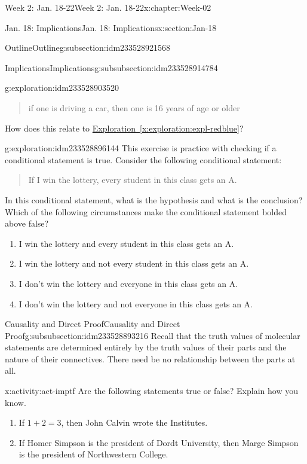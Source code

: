 \documentclass[oneside,10pt,]{book}
\newcommand{\xreffont}{\relax}
\numberwithin{equation}{section}
\begin{document}
\begin{chapterptx}{Week 2: Jan. 18-22}{}{Week 2: Jan. 18-22}{}{}{x:chapter:Week-02}
\begin{sectionptx}{Jan. 18: Implications}{}{Jan. 18: Implications}{}{}{x:section:Jan-18}
\begin{subsectionptx}{Outline}{}{Outline}{}{}{g:subsection:idm233528921568}
\begin{subsubsectionptx}{Implications}{}{Implications}{}{}{g:subsubsection:idm233528914784}
\begin{exploration}{}{g:exploration:idm233528903520}
\begin{quote}%
if one is driving a car, then one is 16 years of age or older\end{quote}
How does this relate to \hyperref[x:exploration:expl-redblue]{Exploration~{\xreffont\ref{x:exploration:expl-redblue}}}?%
\end{exploration}%
\begin{exploration}{}{g:exploration:idm233528896144}%
This exercise is practice with checking if a conditional statement is true. Consider the following conditional statement: \begin{quote}%
If I win the lottery, every student in this class gets an A.\end{quote}
 In this conditional statement, what is the hypothesis and what is the conclusion? Which of the following circumstances make the conditional statement bolded above false?%
%
\begin{enumerate}
\item{}I win the lottery and every student in this class gets an A.%
\item{}I win the lottery and not every student in this class gets an A.%
\item{}I don’t win the lottery and everyone in this class gets an A.%
\item{}I don’t win the lottery and not everyone in this class gets an A.%
\end{enumerate}
\end{exploration}%
\end{subsubsectionptx}
%
%
\typeout{************************************************}
\typeout{************************************************}
%
\begin{subsubsectionptx}{Causality and Direct Proof}{}{Causality and Direct Proof}{}{}{g:subsubsection:idm233528893216}
Recall that the truth values of molecular statements are determined entirely by the truth values of their parts and the nature of their connectives. There need be no relationship between the parts at all.%
\begin{activity}{}{x:activity:act-imptf}%
Are the following statements true or false? Explain how you know.%
%
\begin{enumerate}
\item{}If \(1+2=3\), then John Calvin wrote the Institutes.%
\item{}If Homer Simpson is the president of Dordt University, then Marge Simpson is the president of Northwestern College.%

\end{enumerate}
\end{activity}
\end{subsubsectionptx}
\end{subsectionptx}
\end{sectionptx}
\end{chapterptx}
\end{document}
